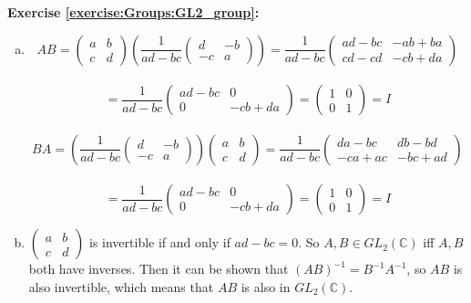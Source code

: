 \noindent\textbf{Exercise \ref{exercise:Groups:GL2_group}:}
\begin{enumerate}[(a)]
\item
\[
AB =
\begin{pmatrix}
a & b \\
c & d
\end{pmatrix} \left(\frac{1}{ad-bc}\begin{pmatrix}
d & -b \\
-c & a
\end{pmatrix}\right)
=
\frac{1}{ad-bc}\begin{pmatrix}
ad - bc & -ab + ba \\
cd - cd & -cb + da
\end{pmatrix}
\]
\\
\[
=
\frac{1}{ad-bc}\begin{pmatrix}
ad - bc & 0 \\
0 & -cb + da
\end{pmatrix}
=
\begin{pmatrix}
1 & 0 \\
0 & 1
\end{pmatrix}
=
I
\]
\\
\[
BA =
\left(\frac{1}{ad-bc}\begin{pmatrix}
d & -b \\
-c & a
\end{pmatrix}\right)\begin{pmatrix}
a & b \\
c & d
\end{pmatrix} 
=
\frac{1}{ad-bc}\begin{pmatrix}
da - bc & db - bd \\
-ca + ac & -bc + ad
\end{pmatrix}
\]
\\
\[
=
\frac{1}{ad-bc}\begin{pmatrix}
ad - bc & 0 \\
0 & -cb + da
\end{pmatrix}
=
\begin{pmatrix}
1 & 0 \\
0 & 1
\end{pmatrix}
=
I
\]

\item
$
\begin{pmatrix}
a & b \\
c & d
\end{pmatrix}$
 is invertible if and only if $ad-bc=0$.  So $A,B \in  GL_2(\mathbb{C})$ iff $A,B$ both have inverses. Then it can be shown that $(AB)^{-1} = B^{-1}A^{-1}$, so $AB$ is also invertible, which means that $AB$ is also in $GL_2(\mathbb{C})$.


\end{enumerate}
